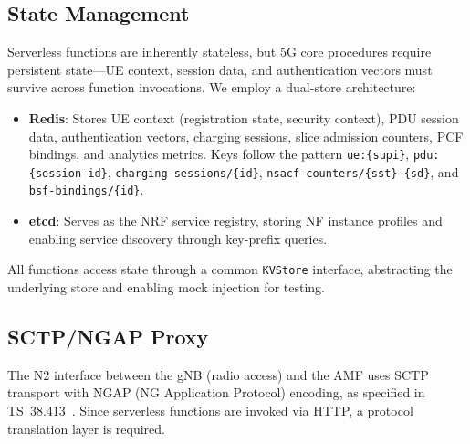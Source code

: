 \documentclass[conference]{IEEEtran}
\begin{document}
\subsection{State Management}

Serverless functions are inherently stateless, but 5G core procedures require persistent state---UE context, session data, and authentication vectors must survive across function invocations. We employ a dual-store architecture:

\begin{itemize}
    \item \textbf{Redis}: Stores UE context (registration state, security context), PDU session data, authentication vectors, charging sessions, slice admission counters, PCF bindings, and analytics metrics. Keys follow the pattern \texttt{ue:\{supi\}}, \texttt{pdu:\{session-id\}}, \texttt{charging-sessions/\{id\}}, \texttt{nsacf-counters/\{sst\}-\{sd\}}, and \texttt{bsf-bindings/\{id\}}.
    \item \textbf{etcd}: Serves as the NRF service registry, storing NF instance profiles and enabling service discovery through key-prefix queries.
\end{itemize}

All functions access state through a common \texttt{KVStore} interface, abstracting the underlying store and enabling mock injection for testing.

\subsection{SCTP/NGAP Proxy}

The N2 interface between the gNB (radio access) and the AMF uses SCTP transport with NGAP (NG Application Protocol) encoding, as specified in TS~38.413~\cite{3gpp-38413}. Since serverless functions are invoked via HTTP, a protocol translation layer is required.
\end{document}
